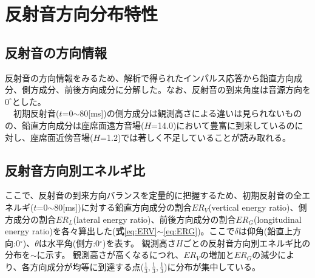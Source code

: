 \chapter{反射音方向分布特性}

\section{反射音の方向情報}
反射音の方向情報をみるため、解析で得られたインパルス応答から鉛直方向成分、側方成分、前後方向成分に分解した。なお、反射音の到来角度は音源方向を$0^\circ$とした。
\\　初期反射音($t$=0$\sim$80[ms])の側方成分は観測高さによる違いは見られないものの、鉛直方向成分は座席面遠方音場($H$=14.0)において豊富に到来しているのに対し、座席面近傍音場($H$=1.2)では著しく不足していることが読み取れる。



\section{反射音方向別エネルギ比}
ここで、反射音の到来方向バランスを定量的に把握するため、初期反射音の全エネルギ($t$=0$\sim$80[ms])に対する鉛直方向成分の割合$ER_V$(vertical energy ratio)、側方成分の割合$ER_L$(lateral energy ratio)、前後方向成分の割合$ER_G$(longitudinal energy ratio)を各々算出した(\textbf{式}\ref{eq:ERV}$\sim$\ref{eq:ERG})。ここで$\delta$は仰角(鉛直上方向:0$^\circ$)、$\theta$は水平角(側方:0$^\circ$)を表す。
観測高さ$H$ごとの反射音方向別エネルギ比の分布を$\sim$に示す。
観測高さが高くなるにつれ、$ER_V$の増加と$ER_G$の減少により、各方向成分が均等に到達する点($\frac{1}{3},\frac{1}{3},\frac{1}{3}$)に分布が集中している。

